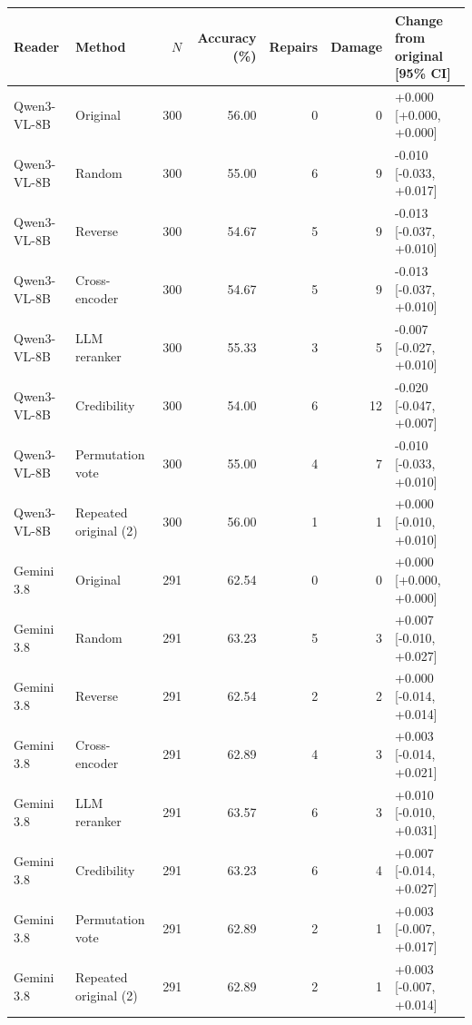 \begin{tabular}{llrrrrl}
\toprule
Reader & Method & $N$ & Accuracy (\%) & Repairs & Damage & Change from original [95\% CI] \\
\midrule
Qwen3-VL-8B & Original & 300 & 56.00 & 0 & 0 & +0.000 [+0.000, +0.000] \\
Qwen3-VL-8B & Random & 300 & 55.00 & 6 & 9 & -0.010 [-0.033, +0.017] \\
Qwen3-VL-8B & Reverse & 300 & 54.67 & 5 & 9 & -0.013 [-0.037, +0.010] \\
Qwen3-VL-8B & Cross-encoder & 300 & 54.67 & 5 & 9 & -0.013 [-0.037, +0.010] \\
Qwen3-VL-8B & LLM reranker & 300 & 55.33 & 3 & 5 & -0.007 [-0.027, +0.010] \\
Qwen3-VL-8B & Credibility & 300 & 54.00 & 6 & 12 & -0.020 [-0.047, +0.007] \\
Qwen3-VL-8B & Permutation vote & 300 & 55.00 & 4 & 7 & -0.010 [-0.033, +0.010] \\
Qwen3-VL-8B & Repeated original (2) & 300 & 56.00 & 1 & 1 & +0.000 [-0.010, +0.010] \\
Gemini 3.8 & Original & 291 & 62.54 & 0 & 0 & +0.000 [+0.000, +0.000] \\
Gemini 3.8 & Random & 291 & 63.23 & 5 & 3 & +0.007 [-0.010, +0.027] \\
Gemini 3.8 & Reverse & 291 & 62.54 & 2 & 2 & +0.000 [-0.014, +0.014] \\
Gemini 3.8 & Cross-encoder & 291 & 62.89 & 4 & 3 & +0.003 [-0.014, +0.021] \\
Gemini 3.8 & LLM reranker & 291 & 63.57 & 6 & 3 & +0.010 [-0.010, +0.031] \\
Gemini 3.8 & Credibility & 291 & 63.23 & 6 & 4 & +0.007 [-0.014, +0.027] \\
Gemini 3.8 & Permutation vote & 291 & 62.89 & 2 & 1 & +0.003 [-0.007, +0.017] \\
Gemini 3.8 & Repeated original (2) & 291 & 62.89 & 2 & 1 & +0.003 [-0.007, +0.014] \\
\bottomrule
\end{tabular}
